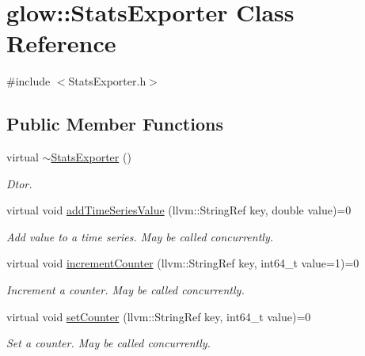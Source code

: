 \hypertarget{classglow_1_1_stats_exporter}{}\section{glow\+:\+:Stats\+Exporter Class Reference}
\label{classglow_1_1_stats_exporter}


{\ttfamily \#include $<$Stats\+Exporter.\+h$>$}

\subsection*{Public Member Functions}
\begin{DoxyCompactItemize}
\item 
\mbox{\label{classglow_1_1_stats_exporter_a9f38009fb3415c9f4d89f3a065a8942a}} 
virtual \hyperlink{classglow_1_1_stats_exporter_a9f38009fb3415c9f4d89f3a065a8942a}{$\sim$\+Stats\+Exporter} ()
\begin{DoxyCompactList}\small\item\em Dtor. \end{DoxyCompactList}\item 
\mbox{\label{classglow_1_1_stats_exporter_a734b507142ae532e2b0b4db628959d0c}} 
virtual void \hyperlink{classglow_1_1_stats_exporter_a734b507142ae532e2b0b4db628959d0c}{add\+Time\+Series\+Value} (llvm\+::\+String\+Ref key, double value)=0
\begin{DoxyCompactList}\small\item\em Add value to a time series. May be called concurrently. \end{DoxyCompactList}\item 
\mbox{\label{classglow_1_1_stats_exporter_ad2a876e0ac6daa8f25446a33a3b385b3}} 
virtual void \hyperlink{classglow_1_1_stats_exporter_ad2a876e0ac6daa8f25446a33a3b385b3}{increment\+Counter} (llvm\+::\+String\+Ref key, int64\+\_\+t value=1)=0
\begin{DoxyCompactList}\small\item\em Increment a counter. May be called concurrently. \end{DoxyCompactList}\item 
\mbox{\label{classglow_1_1_stats_exporter_a9a9cfffb67e1fdc305f68d857c3da262}} 
virtual void \hyperlink{classglow_1_1_stats_exporter_a9a9cfffb67e1fdc305f68d857c3da262}{set\+Counter} (llvm\+::\+String\+Ref key, int64\+\_\+t value)=0
\begin{DoxyCompactList}\small\item\em Set a counter. May be called concurrently. \end{DoxyCompactList}\end{DoxyCompactItemize}


